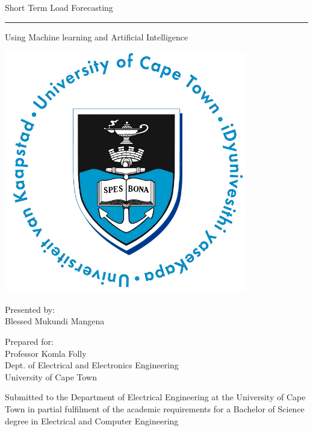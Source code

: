 \documentclass[a4paper,12pt]{report}
\begin{document}
	
	\thispagestyle{empty}
	{\Huge \begin{center}
			Short Term Load Forecasting 
			\hrule 
			{\Large Using Machine learning and Artificial Intelligence}
	\end{center}}
	
	\vskip 5mm
	\begin{center}
		\includegraphics[scale = 1]{Chapters/images/UCT.jpg}
	\end{center}
	
	\vskip 5mm
	\begin{center}
		Presented by:\\
		Blessed Mukundi Mangena 		%
	\end{center}
	
	\vskip 10mm
	\begin{center}
		Prepared for:\\
		Professor Komla Folly\\ 		%
		Dept. of Electrical and Electronics Engineering\\University of Cape Town
	\end{center}
	
	
	\vskip 10mm
	\begin{center}
		Submitted to the Department of Electrical Engineering at the University of Cape Town in partial
		fulfilment of the academic requirements for a Bachelor of Science degree in Electrical and Computer Engineering
		
	\end{center}
	
\end{document}

